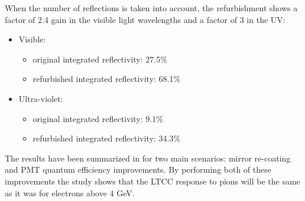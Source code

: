 When the number of reflections is taken into account, the refurbishment shows
a factor of 2.4 gain in the visible light wavelengths and a factor of 3 in the UV:


\begin{itemize}
	\item Visible:
	\begin{itemize}
		\item original integrated reflectivity: 27.5$\%$
		\item refurbished integrated reflectivity: 68.1$\%$
	\end{itemize}
	\item Ultra-violet:
	\begin{itemize}
		\item original integrated reflectivity: 9.1$\%$
		\item refurbished integrated reflectivity: 34.3$\%$
	\end{itemize}
\end{itemize}


The results have been summarized in  for two main scenarios: mirror re-coating and PMT quantum efficiency improvements.
By performing both of these improvements the study shows that the LTCC response to pions will be the same as it was for electrons above 4 GeV.

